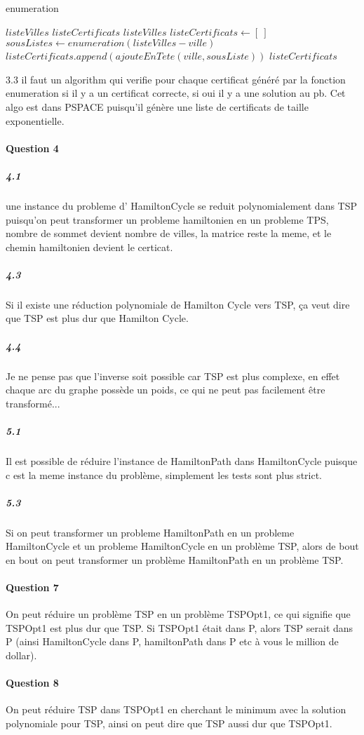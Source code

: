 \documentclass[a4paper,10pt]{article}
\begin{document}
\begin{algorithm}
\caption{enumeration}
\begin{algorithmic}
\REQUIRE $listeVilles$
\ENSURE $listeCertificats$
  \RETURN $listeVilles$
\ENDIF
\STATE $listeCertificats \leftarrow [~]$
  \STATE $sousListes \leftarrow enumeration(listeVilles - ville)$
    \STATE $listeCertificats.append(ajouteEnTete(ville,sousListe)) $
  \ENDFOR
\ENDFOR
\RETURN $listeCertificats$
\end{algorithmic}
\end{algorithm}

3.3 il faut un algorithm qui verifie pour chaque certificat généré par la fonction enumeration si il y a un
certificat correcte, si oui il y a une solution au pb. Cet algo est dans PSPACE puisqu'il génère une liste de certificats de taille exponentielle.

\paragraph{Question 4}
\subparagraph{4.1}
une instance du probleme d' HamiltonCycle se reduit polynomialement dans TSP puisqu'on peut transformer un probleme hamiltonien en un probleme TPS,
nombre de sommet devient nombre de villes, la matrice reste la meme, et le chemin hamiltonien devient le certicat.

\subparagraph{4.3}
Si il existe une réduction polynomiale de Hamilton Cycle vers TSP, ça veut dire que TSP est plus dur que Hamilton Cycle.

\subparagraph{4.4}
Je ne pense pas que l'inverse soit possible car TSP est plus complexe, en effet chaque arc du graphe possède un poids, ce qui ne peut pas facilement 
être transformé... 

\subparagraph{5.1}
Il est possible de réduire l'instance de HamiltonPath dans HamiltonCycle puisque c est la meme instance du problème, simplement les tests sont plus strict.

\subparagraph{5.3}
Si on peut transformer un probleme HamiltonPath en un probleme HamiltonCycle et un probleme HamiltonCycle en un problème TSP, alors de bout en bout on peut 
transformer un problème HamiltonPath en un problème TSP.

\paragraph{Question 7}
On peut réduire un problème TSP en un problème TSPOpt1, ce qui signifie que TSPOpt1 est plus dur que TSP. Si TSPOpt1 était dans P,
alors TSP serait dans P (ainsi HamiltonCycle dans P, hamiltonPath dans P etc à vous le million de dollar).

\paragraph{Question 8}
On peut réduire TSP dans TSPOpt1 en cherchant le minimum avec la solution polynomiale pour TSP, ainsi on peut dire que TSP aussi dur que TSPOpt1.
\end{document}
